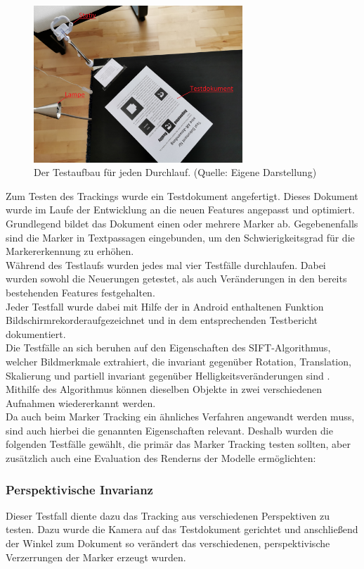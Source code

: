 \begin{figure}[h!]
\centering
\includegraphics[width=0.7\textwidth]{Abbildungen/Testaufbau.jpeg}
\caption[Testaufbau]{Der Testaufbau für jeden Durchlauf. (Quelle: Eigene Darstellung)}
\label{fig:Testaufbau}
\end{figure}
Zum Testen des Trackings wurde ein Testdokument  angefertigt. Dieses Dokument wurde im Laufe der Entwicklung an die neuen Features angepasst und optimiert. Grundlegend bildet das Dokument einen oder mehrere Marker ab. Gegebenenfalls sind die Marker in Textpassagen eingebunden, um den Schwierigkeitsgrad für die Markererkennung zu erhöhen.\\
Während des Testlaufs wurden jedes mal vier Testfälle durchlaufen. Dabei wurden sowohl die Neuerungen getestet, als auch Veränderungen in den bereits bestehenden Features festgehalten.\\
Jeder Testfall wurde dabei mit Hilfe der in Android enthaltenen Funktion \glqq Bildschirmrekorder\grqq aufgezeichnet und in dem entsprechenden Testbericht dokumentiert.\\
Die Testfälle an sich beruhen auf den Eigenschaften des SIFT-Algorithmus, welcher Bildmerkmale extrahiert, die invariant gegenüber Rotation, Translation, Skalierung und partiell invariant gegenüber Helligkeitsveränderungen sind \citep[S. 345]{nischwitz:bildverarbeitung}. Mithilfe des Algorithmus können dieselben Objekte in zwei verschiedenen Aufnahmen wiedererkannt werden.\\
Da auch beim Marker Tracking ein ähnliches Verfahren angewandt werden muss, sind auch hierbei die genannten Eigenschaften relevant. Deshalb wurden die folgenden Testfälle gewählt, die primär das Marker Tracking testen sollten, aber zusätzlich auch eine Evaluation des Renderns der Modelle ermöglichten:

\subsubsection{Perspektivische Invarianz}
Dieser Testfall diente dazu das Tracking aus verschiedenen Perspektiven zu testen. Dazu wurde die Kamera auf das Testdokument gerichtet und anschließend der Winkel zum Dokument so verändert das verschiedenen, perspektivische Verzerrungen der Marker erzeugt wurden.


